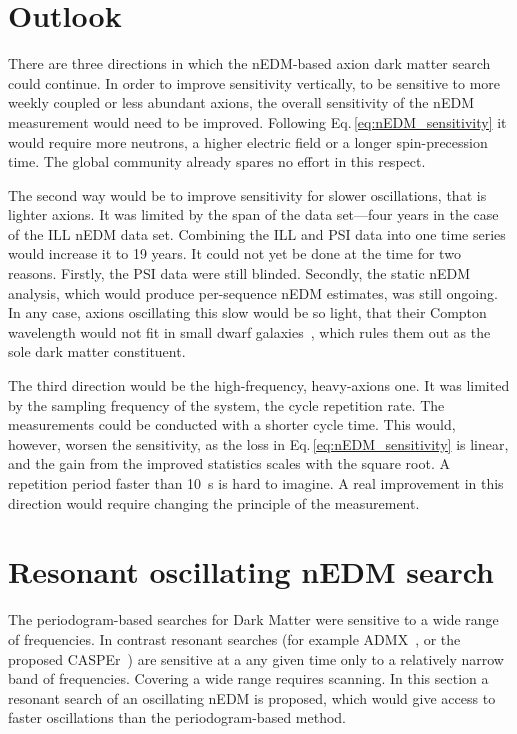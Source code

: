 \section{Outlook}
There are three directions in which the nEDM-based axion dark matter search could continue.
In order to improve sensitivity vertically, to be sensitive to more weekly coupled or less abundant axions, the overall sensitivity of the nEDM measurement would need to be improved.
Following Eq.\,\ref{eq:nEDM_sensitivity} it would require more neutrons, a higher electric field or a longer spin-precession time.
The global community already spares no effort in this respect.

The second way would be to improve sensitivity for slower oscillations, that is  lighter axions.
It was limited by the span of the data set---four years in the case of the ILL nEDM data set.
Combining the ILL and PSI data into one time series would increase it to 19 years.
It could not yet be done at the time for two reasons.
Firstly, the PSI data were still blinded.
Secondly, the static nEDM analysis, which would produce per-sequence nEDM estimates, was still ongoing.
In any case, axions oscillating this slow would be so light, that their Compton wavelength would not fit in small dwarf galaxies~\cite{Marsh2015Review}, which rules them out as the sole dark matter constituent.

The third direction would be the high-frequency, heavy-axions one.
It was limited by the sampling frequency of the system, the cycle repetition rate.
The measurements could be conducted with a shorter cycle time.
This would, however, worsen the sensitivity, as the loss in Eq.\,\ref{eq:nEDM_sensitivity} is linear, and the gain from the improved statistics scales with the square root.
A repetition period faster than \SI{10}{\second} is hard to imagine.
A real improvement in this direction would require changing the principle of the measurement.




\section{Resonant oscillating nEDM search}
The periodogram-based searches for Dark Matter were sensitive to a wide range of frequencies.
In contrast resonant searches (for example ADMX~\cite{PhysRevLett.104.041301}, or the proposed CASPEr~\cite{CASPEr2014}) are sensitive at a any given time only to a relatively narrow band of frequencies.
Covering a wide range requires scanning.
In this section a resonant search of an oscillating nEDM is proposed, which would give access to faster oscillations than the periodogram-based method.


